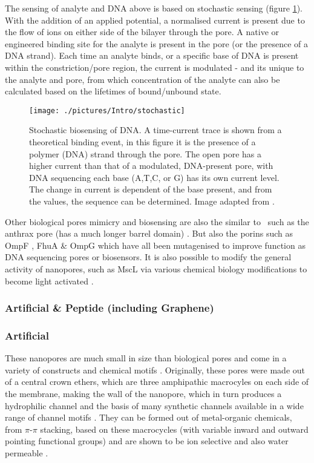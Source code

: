 The sensing of analyte and DNA above is based on stochastic sensing (figure \ref{fig:stochastic}). With the addition of an applied potential, a normalised current is present due to the flow of ions on either side of the bilayer through the pore. A native or engineered binding site for the analyte is present in the pore (or the presence of a DNA strand). Each time an analyte binds, or a specific base of DNA is present within the constriction/pore region, the current is modulated - and its unique to the analyte and pore, from which concentration of the analyte can also be calculated based on the lifetimes of bound/unbound state.

\begin{figure}[H]
\begin{center}
\texttt{[image: ./pictures/Intro/stochastic]}
\caption[Stochastic biosensing of DNA.] {Stochastic biosensing of DNA. A time-current trace is shown from a theoretical binding event, in this figure it is the presence of a polymer (DNA) strand through the pore. The open pore has a higher current than that of a modulated, DNA-present pore, with DNA sequencing each base (A,T,C, or G) has its own current level. The change in current is dependent of the base present, and from the values, the sequence can be determined. Image adapted from \cite{Branton2008}.}
\label{fig:stochastic}
\end{center}
\end{figure}

Other biological pores mimicry and biosensing are also the similar to \ahl\ such as the anthrax pore (has a much longer barrel domain) \cite{Halverson2005}. But also the porins such as OmpF \cite{Hadi2014}, FhuA \cite{Mohammad2011,Niedzwiecki2012,Killmann1996} \& OmpG \cite{Chen2008,Zhuang2014} which have all been mutagenised to improve function as DNA sequencing pores or biosensors. It is also possible to modify the general activity of nanopores, such as MscL via various chemical biology modifications to become light activated \cite{Kocer2005}. 

\subsubsection{Artificial \& Peptide (including Graphene)}

\subsubsection*{Artificial} 
These nanopores are much small in size than biological pores and come in a variety of constructs and chemical motifs \cite{Ghadiri1994,Clark1999,Sakai2013}. Originally, these pores were made out of a central crown ethers, which are three amphipathic macrocyles on each side of the membrane, making the wall of the nanopore, which in turn produces a hydrophilic channel \cite{Carmichael1989} and the basis of many synthetic channels available in a wide range of channel motifs \cite{Echegoyen1994}. They can be formed out of metal-organic chemicals, from $\pi$-$\pi$ stacking, based on these macrocycles (with variable inward and outward pointing functional groups) and are shown to be ion selective and also water permeable \cite{Zhou2012}.

